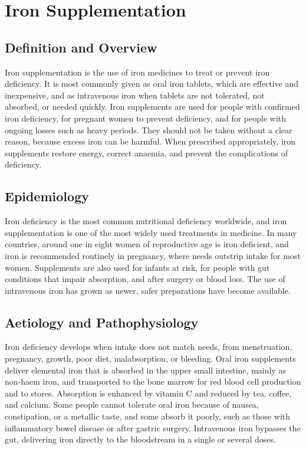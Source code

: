 \chapter{Iron Supplementation}

\section*{Definition and Overview}
Iron supplementation is the use of iron medicines to treat or prevent iron deficiency. It is most commonly given as oral iron tablets, which are effective and inexpensive, and as intravenous iron when tablets are not tolerated, not absorbed, or needed quickly. Iron supplements are used for people with confirmed iron deficiency, for pregnant women to prevent deficiency, and for people with ongoing losses such as heavy periods. They should not be taken without a clear reason, because excess iron can be harmful. When prescribed appropriately, iron supplements restore energy, correct anaemia, and prevent the complications of deficiency.

\section*{Epidemiology}
Iron deficiency is the most common nutritional deficiency worldwide, and iron supplementation is one of the most widely used treatments in medicine. In many countries, around one in eight women of reproductive age is iron deficient, and iron is recommended routinely in pregnancy, where needs outstrip intake for most women. Supplements are also used for infants at risk, for people with gut conditions that impair absorption, and after surgery or blood loss. The use of intravenous iron has grown as newer, safer preparations have become available.

\section*{Aetiology and Pathophysiology}
Iron deficiency develops when intake does not match needs, from menstruation, pregnancy, growth, poor diet, malabsorption, or bleeding. Oral iron supplements deliver elemental iron that is absorbed in the upper small intestine, mainly as non-haem iron, and transported to the bone marrow for red blood cell production and to stores. Absorption is enhanced by vitamin C and reduced by tea, coffee, and calcium. Some people cannot tolerate oral iron because of nausea, constipation, or a metallic taste, and some absorb it poorly, such as those with inflammatory bowel disease or after gastric surgery. Intravenous iron bypasses the gut, delivering iron directly to the bloodstream in a single or several doses.

